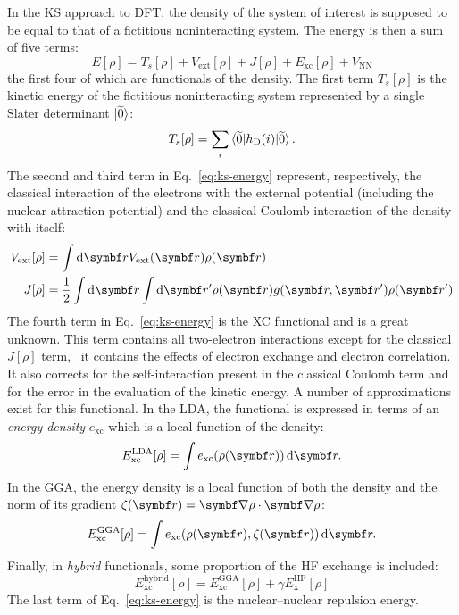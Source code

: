 In the \gls{KS} approach to \acrshort{DFT}, the density of the system of interest
is supposed to be equal to that of a fictitious noninteracting
system.\autocite{Kohn1965-hg}
The energy is then a sum of five terms:
\begin{equation}\label{eq:ks-energy}
 E[\rho] = T_s[\rho] + V_\mathrm{ext}[\rho] + J[\rho] + E_\mathrm{xc}[\rho] + V_\mathrm{NN}
\end{equation}
the first four of which  are functionals of the density. The first term
$T_s[\rho]$ is the kinetic energy of the fictitious noninteracting
system represented by a single Slater determinant $\ket{\widetilde{0}}$:
\begin{equation}
 T_s[\rho] = \sum_i \braket{\widetilde{0}|h_\mathrm{D}(i)|\widetilde{0}}.
\end{equation}
The second and third term in Eq.~\eqref{eq:ks-energy} represent,
respectively, the classical interaction of the electrons with the
external potential (including the nuclear attraction potential) and the
classical Coulomb interaction of the density with itself:
\begin{subequations}
 \begin{align}
   V_\mathrm{ext}[\rho] &= \int\diff\vect{r} V_\mathrm{ext}(\vect{r})\rho(\vect{r}) \\
   J[\rho] &=
   \frac{1}{2}\int\diff\vect{r}\int\diff\vect{r}^\prime
   \rho(\vect{r})g(\vect{r}, \vect{r}^\prime)\rho(\vect{r}^\prime)
 \end{align}
\end{subequations}
The fourth term in Eq.~\eqref{eq:ks-energy} is the
\gls{XC} functional and is a great unknown. This term
contains all two-electron interactions except for the classical
$J[\rho]$ term, \ie~it contains the effects of electron exchange and
electron correlation. It also corrects for the self-interaction present
in the classical Coulomb term and for the error in the evaluation of the
kinetic energy.
A number of approximations exist for this functional.
In the \gls{LDA}, the functional is expressed in terms of an
\emph{energy density} $e_\mathrm{xc}$ which is a local function of the
density:
\begin{equation}
 E^\mathrm{LDA}_\mathrm{xc}[\rho] = \int e_\mathrm{xc}(\rho(\vect{r}))\diff\vect{r}.
\end{equation}
In the \gls{GGA}, the energy
density is a local function of both the density and the norm of its
gradient $\zeta(\vect{r})=\vect{\nabla}\rho\cdot \vect{\nabla}\rho$:
\begin{equation}
 E^\mathrm{GGA}_\mathrm{xc}[\rho] = \int e_\mathrm{xc}(\rho(\vect{r}),\zeta(\vect{r}))\diff\vect{r}.
\end{equation}
Finally, in \emph{hybrid} functionals, some proportion of the
\acrshort{HF} exchange is included:
\begin{equation}
 E^\mathrm{hybrid}_\mathrm{xc}[\rho] = E^\mathrm{GGA}_\mathrm{xc}[\rho] + \gamma E^\mathrm{HF}_\mathrm{x}[\rho]
\end{equation}
The last term of Eq.~\eqref{eq:ks-energy} is the nuclear--nuclear repulsion energy.

